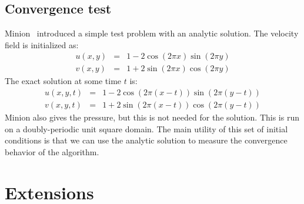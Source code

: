\subsection{Convergence test}

Minion~\cite{minion:1996} introduced a simple test problem with an analytic solution.
The velocity field is initialized as:
\begin{eqnarray}
u(x,y) &=& 1 - 2 \cos(2 \pi x) \sin(2 \pi y) \\
v(x,y) &=& 1 + 2 \sin(2 \pi x) \cos(2 \pi y)
\end{eqnarray}
The exact solution at some time $t$ is:
\begin{eqnarray}
u(x,y,t) &=& 1 - 2 \cos(2 \pi (x - t)) \sin(2 \pi (y - t)) \\
v(x,y,t) &=& 1 + 2 \sin(2 \pi (x - t)) \cos(2 \pi (y - t))
\end{eqnarray}
Minion also gives the pressure, but this is not needed for the
solution.  This is run on a doubly-periodic unit square domain.  The
main utility of this set of initial conditions is that we can use the
analytic solution to measure the convergence behavior of the
algorithm. 


\section{Extensions}

